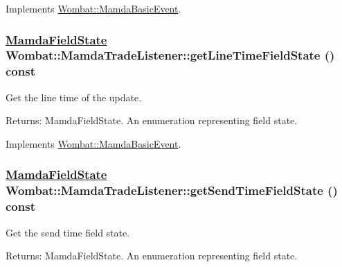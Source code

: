 Implements \hyperlink{classWombat_1_1MamdaBasicEvent_a61a566e3442181ca1fadc4524296cd0}{Wombat::Mamda\-Basic\-Event}.\hypertarget{classWombat_1_1MamdaTradeListener_dca5ca34bb9de2bdd8579a618dda72dd}{
\subsubsection[getLineTimeFieldState]{\setlength{\rightskip}{0pt plus 5cm}\hyperlink{namespaceWombat_93aac974f2ab713554fd12a1fa3b7d2a}{Mamda\-Field\-State} Wombat::Mamda\-Trade\-Listener::get\-Line\-Time\-Field\-State () const}}
\label{classWombat_1_1MamdaTradeListener_dca5ca34bb9de2bdd8579a618dda72dd}


Get the line time of the update. 

\begin{Desc}
\item[Returns:]Mamda\-Field\-State. An enumeration representing field state. \end{Desc}


Implements \hyperlink{classWombat_1_1MamdaBasicEvent_eb06352aca3280c5e89bad7a3b185cdf}{Wombat::Mamda\-Basic\-Event}.\hypertarget{classWombat_1_1MamdaTradeListener_1a7d2527a9aa376990eb4f50a799996a}{
\subsubsection[getSendTimeFieldState]{\setlength{\rightskip}{0pt plus 5cm}\hyperlink{namespaceWombat_93aac974f2ab713554fd12a1fa3b7d2a}{Mamda\-Field\-State} Wombat::Mamda\-Trade\-Listener::get\-Send\-Time\-Field\-State () const}}
\label{classWombat_1_1MamdaTradeListener_1a7d2527a9aa376990eb4f50a799996a}


Get the send time field state. 

\begin{Desc}
\item[Returns:]Mamda\-Field\-State. An enumeration representing field state. \end{Desc}


